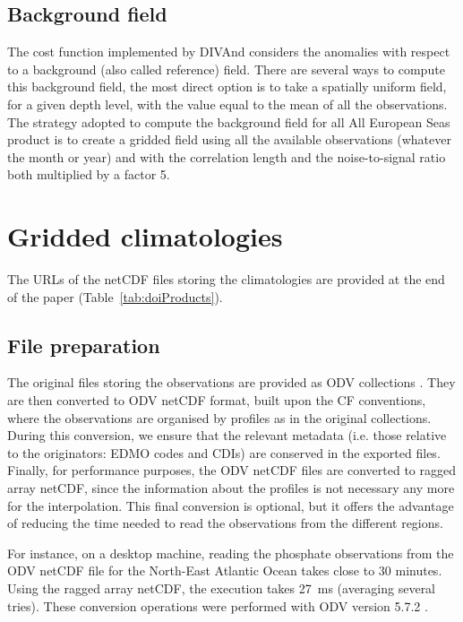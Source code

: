 \documentclass[essd,manuscript]{copernicus}
\begin{document}
\subsection{Background field}

The cost function implemented by DIVAnd considers the anomalies with respect to a background (also called reference) field. There are several ways to compute this background field, the most direct option is to take a spatially uniform field, for a given depth level, with the value equal to the mean of all the observations. The strategy adopted to compute the background field for all All European Seas product is to create a gridded field using all the available observations (whatever the month or year) and with the correlation length and the noise-to-signal ratio both multiplied by a factor 5. 

\section{Gridded climatologies\label{sec:clim}}

The URLs of the netCDF files storing the climatologies are provided at the end of the paper (Table~\ref{tab:doiProducts}).

\subsection{File preparation}

The original files storing the observations are provided as ODV collections \citep[Ocean Data View,][]{SCHLITZER2002}. They are then converted to ODV netCDF format, built upon the CF conventions, where the observations are organised by profiles as in the original collections. During this conversion, we ensure that the relevant metadata (i.e. those relative to the originators: EDMO codes and CDIs) are conserved in the exported files. Finally, for performance purposes, the ODV netCDF files are converted to ragged array netCDF, since the information about the profiles is not necessary any more for the interpolation. This final conversion is optional, but it offers the advantage of reducing the time needed to read the observations from the different regions.

For instance, on a desktop machine, reading the phosphate observations from the ODV netCDF file for the North-East Atlantic Ocean takes close to 30 minutes. Using the ragged array netCDF, the execution takes 27~ms (averaging several tries). These conversion operations were performed with ODV version 5.7.2 \citep{Schlitzer2024}.
\end{document}

